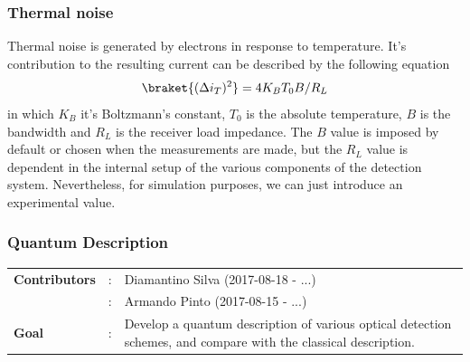 \subsubsection{Thermal noise}
Thermal noise is generated by electrons in response to temperature. It's contribution to the resulting current can be described by the following equation
\cite{fox2006}
%
\begin{equation}
\braket{(\Delta i_T)^2} = 4 K_B T_0 B/R_L
\end{equation}
%
in which $K_B$ it's Boltzmann's constant, $T_0$ is the absolute temperature, $B$ is the bandwidth and $R_L$ is the receiver load impedance. The $B$ value is imposed by default or chosen when the measurements are made, but the $R_L$ value is dependent in the internal setup of the various components of the detection system. Nevertheless, for simulation purposes, we can just introduce an experimental value.\\
\vspace{1cm}
%
%


\subsubsection{Quantum Description}

\begin{tcolorbox}	
\begin{tabular}{p{2.75cm} p{0.2cm} p{10.5cm}}
\textbf{Contributors}  &:& Diamantino Silva (2017-08-18 - ...)\\
                       &:& Armando Pinto (2017-08-15 - ...)\\
\textbf{Goal}          &:& Develop a quantum description of various optical detection schemes, and compare with the classical description.\\
\end{tabular}
\end{tcolorbox}

